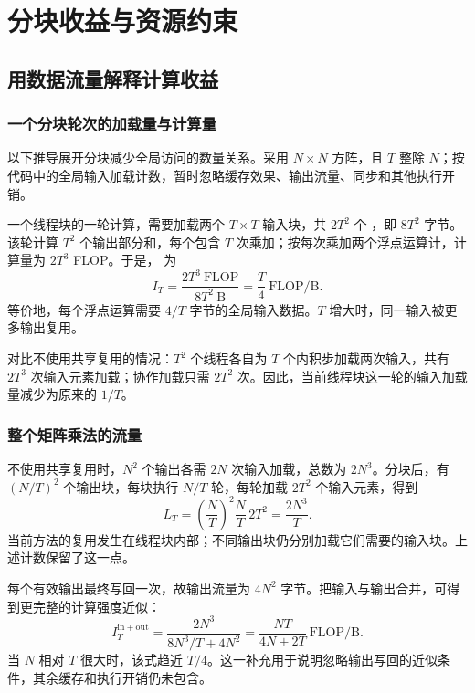 \section{分块收益与资源约束}
\label{l6:sec:performance}

\subsection{用数据流量解释计算收益}
\subsubsection{一个分块轮次的加载量与计算量}
以下推导展开分块减少全局访问的数量关系。采用 $N\times N$ 方阵，且 $T$ 整除 $N$；按代码中的全局输入加载计数，暂时忽略缓存效果、输出流量、同步和其他执行开销。

一个线程块的一轮计算，需要加载两个 $T\times T$ 输入块，共 $2T^2$ 个 ，即 $8T^2$ 字节。该轮计算 $T^2$ 个输出部分和，每个包含 $T$ 次乘加；按每次乘加两个浮点运算计，计算量为 $2T^3$ FLOP。于是， 为
\begin{equation}
 I_T=\frac{2T^3\ \mathrm{FLOP}}{8T^2\ \mathrm{B}}
 =\frac{T}{4}\ \mathrm{FLOP/B}.
 \label{l6:eq:arithmetic-intensity}
\end{equation}
等价地，每个浮点运算需要 $4/T$ 字节的全局输入数据。$T$ 增大时，同一输入被更多输出复用。

对比不使用共享复用的情况：$T^2$ 个线程各自为 $T$ 个内积步加载两次输入，共有 $2T^3$ 次输入元素加载；协作加载只需 $2T^2$ 次。因此，当前线程块这一轮的输入加载量减少为原来的 $1/T$。

\subsubsection{整个矩阵乘法的流量}
不使用共享复用时，$N^2$ 个输出各需 $2N$ 次输入加载，总数为 $2N^3$。分块后，有 $(N/T)^2$ 个输出块，每块执行 $N/T$ 轮，每轮加载 $2T^2$ 个输入元素，得到
\begin{equation}
 L_T=\left(\frac{N}{T}\right)^2
      \frac{N}{T}\,2T^2
    =\frac{2N^3}{T}.
 \label{l6:eq:global-load-count}
\end{equation}
当前方法的复用发生在线程块内部；不同输出块仍分别加载它们需要的输入块。上述计数保留了这一点。

\begin{derivationbox}[title={将输出写回加入流量模型}]
每个有效输出最终写回一次，故输出流量为 $4N^2$ 字节。把输入与输出合并，可得到更完整的计算强度近似：
\[
 I_T^{\mathrm{in+out}}
 =\frac{2N^3}{8N^3/T+4N^2}
 =\frac{NT}{4N+2T}\ \mathrm{FLOP/B}.
\]
当 $N$ 相对 $T$ 很大时，该式趋近 $T/4$。这一补充用于说明忽略输出写回的近似条件，其余缓存和执行开销仍未包含。
\end{derivationbox}

